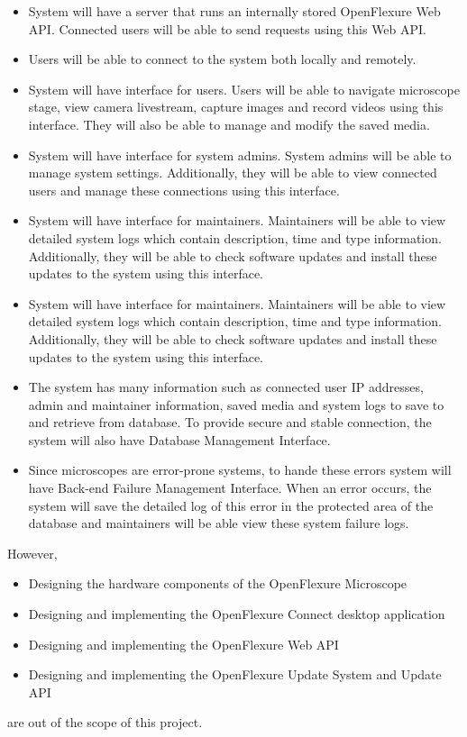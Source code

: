 \begin{itemize}
  \item System will have a server that runs an internally stored OpenFlexure Web API. Connected users will be able to send requests using this Web API.
  \item Users will be able to connect to the system both locally and remotely.
  \item System will have interface for users. Users will be able to navigate microscope stage, view camera livestream, capture images and record videos using this interface. They will also be able to manage and modify the saved media.
  \item System will have interface for system admins. System admins will be able to manage system settings. Additionally, they will be able to view connected users and manage these connections using this interface.
  \item System will have interface for maintainers. Maintainers will be able to view detailed system logs which contain description, time and type information. Additionally, they will be able to check software updates and install these updates to the system using this interface.
  \item System will have interface for maintainers. Maintainers will be able to view detailed system logs which contain description, time and type information. Additionally, they will be able to check software updates and install these updates to the system using this interface.
  \item The system has many information such as connected user IP addresses, admin and maintainer information, saved media and system logs to save to and retrieve from database. To provide secure and stable connection, the system will also have Database Management Interface.
  \item Since microscopes are error-prone systems, to hande these errors system will have Back-end Failure Management Interface. When an error occurs, the system will save the detailed log of this error in the protected area of ​​the database and maintainers will be able view these system failure logs.
\end{itemize}
However,
\begin{itemize}
	\item Designing the hardware components of the OpenFlexure Microscope 
	\item Designing and implementing the OpenFlexure Connect desktop application
	\item Designing and implementing the OpenFlexure Web API
	\item Designing and implementing the OpenFlexure Update System and Update API
\end{itemize}
are out of the scope of this project.